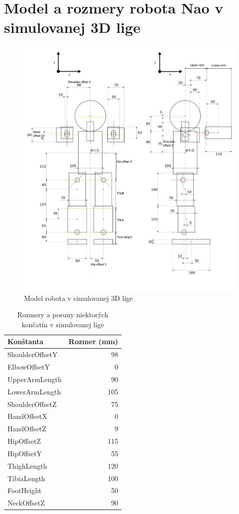 \section{Model a rozmery robota Nao v simulovanej 3D lige}
	\label{appendix_nao_model}
\begin{figure}[H]
  \center
  \includegraphics[scale=0.4]{./data/nao_model}
  \caption{Model robota v simulovanej 3D lige \cite{simspark}}
  \label{nao_model}
\end{figure}

\begin{table}
\caption{Rozmery a posuny niektorých končatín v simulovanej lige}
\centering
\begin{tabular}{|l|r|}
\hline
\textbf{Konštanta} & \textbf{Rozmer (mm)} \\ 
\hline
ShoulderOffsetY	& 98 \\
\hline
ElbowOffsetY & 0 \\
\hline
UpperArmLength & 90 \\
\hline
LowerArmLength & 105 \\
\hline
ShoulderOffsetZ	& 75 \\
\hline
HandOffsetX	& 0 \\
\hline
HandOffsetZ & 9 \\
\hline
HipOffsetZ & 115 \\
\hline
HipOffsetY & 55 \\
\hline
ThighLength	& 120 \\
\hline
TibiaLength	& 100 \\
\hline
FootHeight & 50 \\
\hline
NeckOffsetZ & 90 \\
\hline
\end{tabular}
\end{table}